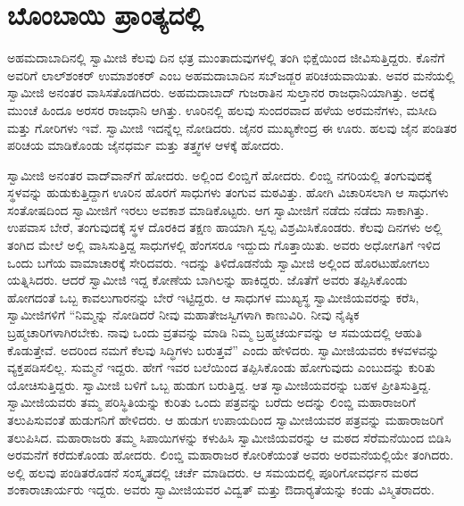 
\chapter{ಬೊಂಬಾಯಿ ಪ್ರಾಂತ್ಯದಲ್ಲಿ}

ಅಹಮದಾಬಾದಿನಲ್ಲಿ ಸ್ವಾಮೀಜಿ ಕೆಲವು ದಿನ ಛತ್ರ ಮುಂತಾದುವುಗಳಲ್ಲಿ ತಂಗಿ ಭಿಕ್ಷೆಯಿಂದ ಜೀವಿಸುತ್ತಿದ್ದರು. ಕೊನೆಗೆ ಅವರಿಗೆ ಲಾಲ್‍ಶಂಕರ್ ಉಮಾಶಂಕರ್ ಎಂಬ ಅಹಮದಾಬಾದಿನ ಸಬ್‍ಜಡ್ಜರ ಪರಿಚಯವಾಯಿತು. ಅವರ ಮನೆಯಲ್ಲಿ ಸ್ವಾಮೀಜಿ ಅನಂತರ ವಾಸಿಸತೊಡಗಿದರು. ಅಹಮದಾಬಾದ್ ಗುಜರಾತಿನ ಸುಲ್ತಾನರ ರಾಜಧಾನಿಯಾಗಿತ್ತು. ಅದಕ್ಕೆ ಮುಂಚೆ ಹಿಂದೂ ಅರಸರ ರಾಜಧಾನಿ ಆಗಿತ್ತು. ಊರಿನಲ್ಲಿ ಹಲವು ಸುಂದರವಾದ ಹಳೆಯ ಅರಮನೆಗಳು, ಮಸೀದಿ ಮತ್ತು ಗೋರಿಗಳು ಇವೆ. ಸ್ವಾಮೀಜಿ ಇದನ್ನೆಲ್ಲ ನೋಡಿದರು. ಜೈನರ ಮುಖ್ಯಕೇಂದ್ರ ಈ ಊರು. ಹಲವು ಜೈನ ಪಂಡಿತರ ಪರಿಚಯ ಮಾಡಿಕೊಂಡು ಜೈನಧರ್ಮ ಮತ್ತು ತತ್ತ್ವಗಳ ಆಳಕ್ಕೆ ಹೋದರು.

ಸ್ವಾಮೀಜಿ ಅನಂತರ ವಾದ್‍ವಾನ್‍ಗೆ ಹೋದರು. ಅಲ್ಲಿಂದ ಲಿಂಬ್ಡಿಗೆ ಹೋದರು. ಲಿಂಬ್ಡಿ ನಗರಿಯಲ್ಲಿ ತಂಗುವುದಕ್ಕೆ ಸ್ಥಳವನ್ನು ಹುಡುಕುತ್ತಿದ್ದಾಗ ಊರಿನ ಹೊರಗೆ ಸಾಧುಗಳು ತಂಗುವ ಮಠವಿತ್ತು. ಹೋಗಿ ವಿಚಾರಿಸಲಾಗಿ ಆ ಸಾಧುಗಳು ಸಂತೋಷದಿಂದ ಸ್ವಾಮೀಜಿಗೆ ಇರಲು ಅವಕಾಶ ಮಾಡಿಕೊಟ್ಟರು. ಆಗ ಸ್ವಾಮೀಜಿಗೆ ನಡೆದು ನಡೆದು ಸಾಕಾಗಿತ್ತು. ಉಪವಾಸ ಬೇರೆ, ತಂಗುವುದಕ್ಕೆ ಸ್ಥಳ ದೊರಕಿದ ತಕ್ಷಣ ಹಾಯಾಗಿ ಸ್ವಲ್ಪ ವಿಶ್ರಮಿಸಿಕೊಂಡರು. ಕೆಲವು ದಿನಗಳು ಅಲ್ಲಿ ತಂಗಿದ ಮೇಲೆ ಅಲ್ಲಿ ವಾಸಿಸುತ್ತಿದ್ದ ಸಾಧುಗಳಲ್ಲಿ ಹೆಂಗಸರೂ ಇದ್ದುದು ಗೊತ್ತಾಯಿತು. ಅವರು ಅಧೋಗತಿಗೆ ಇಳಿದ ಒಂದು ಬಗೆಯ ವಾಮಾಚಾರಕ್ಕೆ ಸೇರಿದವರು. ಇದನ್ನು ತಿಳಿದೊಡನೆಯೆ ಸ್ವಾಮೀಜಿ ಅಲ್ಲಿಂದ ಹೊರಟುಹೋಗಲು ಯತ್ನಿಸಿದರು. ಆದರೆ ಸ್ವಾಮೀಜಿ ಇದ್ದ ಕೋಣೆಯ ಬಾಗಿಲನ್ನು ಹಾಕಿದ್ದರು. ಜೊತೆಗೆ ಅವರು ತಪ್ಪಿಸಿಕೊಂಡು ಹೋಗದಂತೆ ಒಬ್ಬ ಕಾವಲುಗಾರನನ್ನು ಬೇರೆ ಇಟ್ಟಿದ್ದರು. ಆ ಸಾಧುಗಳ ಮುಖ್ಯಸ್ಥ ಸ್ವಾಮೀಜಿಯವರನ್ನು ಕರೆಸಿ, ಸ್ವಾಮೀಜಿಗಳಿಗೆ “ನಿಮ್ಮನ್ನು ನೋಡಿದರೆ ನೀವು ಮಹಾತೇಜಸ್ವಿಗಳಾಗಿ ಕಾಣುವಿರಿ. ನೀವು ನೈಷ್ಠಿಕ ಬ್ರಹ್ಮಚಾರಿಗಳಾಗಿರಬೇಕು. ನಾವು ಒಂದು ವ್ರತವನ್ನು ಮಾಡಿ ನಿಮ್ಮ ಬ್ರಹ್ಮಚರ್ಯವನ್ನು ಆ ಸಮಯದಲ್ಲಿ ಆಹುತಿ ಕೊಡುತ್ತೇವೆ. ಅದರಿಂದ ನಮಗೆ ಕೆಲವು ಸಿದ್ಧಿಗಳು ಬರುತ್ತವೆ” ಎಂದು ಹೇಳಿದರು. ಸ್ವಾಮೀಜಿಯವರು ಕಳವಳವನ್ನು ವ್ಯಕ್ತಪಡಿಸಲಿಲ್ಲ. ಸುಮ್ಮನೆ ಇದ್ದರು. ಹೇಗೆ ಇವರ ಬಲೆಯಿಂದ ತಪ್ಪಿಸಿಕೊಂಡು ಹೋಗುವುದು ಎಂಬುದನ್ನು ಕುರಿತು ಯೋಚಿಸುತ್ತಿದ್ದರು. ಸ್ವಾಮೀಜಿ ಬಳಿಗೆ ಒಬ್ಬ ಹುಡುಗ ಬರುತ್ತಿದ್ದ. ಆತ ಸ್ವಾಮೀಜಿಯವರನ್ನು ಬಹಳ ಪ್ರೀತಿಸುತ್ತಿದ್ದ. ಸ್ವಾಮೀಜಿಯವರು ತಮ್ಮ ಪರಿಸ್ಥಿತಿಯನ್ನು ಕುರಿತು ಒಂದು ಪತ್ರವನ್ನು ಬರೆದು ಅದನ್ನು ಲಿಂಬ್ಡಿ ಮಹಾರಾಜರಿಗೆ ತಲುಪಿಸುವಂತೆ ಹುಡುಗನಿಗೆ ಹೇಳಿದರು. ಆ ಹುಡುಗ ಉಪಾಯದಿಂದ ಸ್ವಾಮೀಜಿಯವರ ಪತ್ರವನ್ನು ಮಹಾರಾಜರಿಗೆ ತಲುಪಿಸಿದ. ಮಹಾರಾಜರು ತಮ್ಮ ಸಿಪಾಯಿಗಳನ್ನು ಕಳುಹಿಸಿ ಸ್ವಾಮೀಜಿಯವರನ್ನು ಆ ಮಠದ ಸೆರೆಮನೆಯಿಂದ ಬಿಡಿಸಿ ಅರಮನೆಗೆ ಕರೆದುಕೊಂಡು ಹೋದರು. ಲಿಂಬ್ಡಿ ಮಹಾರಾಜರ ಕೋರಿಕೆಯಂತೆ ಅವರು ಅರಮನೆಯಲ್ಲಿಯೇ ತಂಗಿದರು. ಅಲ್ಲಿ ಹಲವು ಪಂಡಿತರೊಡನೆ ಸಂಸ್ಕೃತದಲ್ಲಿ ಚರ್ಚೆ ಮಾಡಿದರು. ಆ ಸಮಯದಲ್ಲಿ ಪೂರಿಗೋವರ್ಧನ ಮಠದ ಶಂಕಾರಾಚಾರ್ಯರು ಇದ್ದರು. ಅವರು ಸ್ವಾಮೀಜಿಯವರ ವಿದ್ವತ್ ಮತ್ತು ಔದಾರ‍್ಯತೆಯನ್ನು ಕಂಡು ವಿಸ್ಮಿತರಾದರು. 

